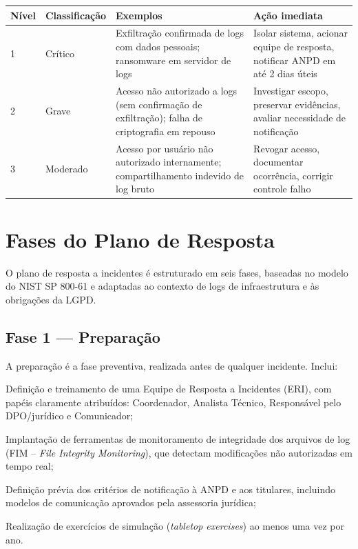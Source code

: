 \begin{quadro}[htb]
    \caption{\label{qdr:incidentes}Classificação de incidentes envolvendo logs de infraestrutura}
    \begin{tabular}{|p{1.5cm}|p{3cm}|p{4cm}|p{5.3cm}|}
        \hline
        \textbf{Nível} & \textbf{Classificação} & \textbf{Exemplos} & \textbf{Ação imediata} \\
        \hline
        1 & Crítico & Exfiltração confirmada de logs com dados pessoais; ransomware em servidor de logs & Isolar sistema, acionar equipe de resposta, notificar ANPD em até 2 dias úteis \\
        \hline
        2 & Grave & Acesso não autorizado a logs (sem confirmação de exfiltração); falha de criptografia em repouso & Investigar escopo, preservar evidências, avaliar necessidade de notificação \\
        \hline
        3 & Moderado & Acesso por usuário não autorizado internamente; compartilhamento indevido de log bruto & Revogar acesso, documentar ocorrência, corrigir controle falho \\
        \hline
    \end{tabular}
\end{quadro}

\section{Fases do Plano de Resposta}
\label{sec:fases}

O plano de resposta a incidentes é estruturado em seis fases, baseadas no modelo do NIST SP 800-61 \cite{nist2012incident} e adaptadas ao contexto de logs de infraestrutura e às obrigações da LGPD.

\subsection{Fase 1 — Preparação}
\label{subsec:preparacao}

A preparação é a fase preventiva, realizada antes de qualquer incidente. Inclui:

\begin{alineas}
    \item Definição e treinamento de uma Equipe de Resposta a Incidentes (ERI), com papéis claramente atribuídos: Coordenador, Analista Técnico, Responsável pelo DPO/jurídico e Comunicador;
    \item Implantação de ferramentas de monitoramento de integridade dos arquivos de log (FIM -- \textit{File Integrity Monitoring}), que detectam modificações não autorizadas em tempo real;
    \item Definição prévia dos critérios de notificação à ANPD e aos titulares, incluindo modelos de comunicação aprovados pela assessoria jurídica;
    \item Realização de exercícios de simulação (\textit{tabletop exercises}) ao menos uma vez por ano.
\end{alineas}

